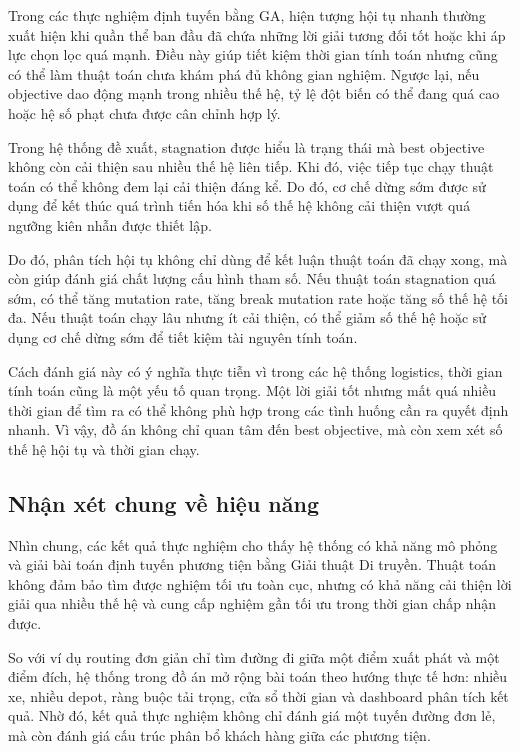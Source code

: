 \documentclass[12pt,a4paper]{article}
\numberwithin{figure}{subsection}
\begin{document}
Trong các thực nghiệm định tuyến bằng GA, hiện tượng hội tụ nhanh thường xuất hiện khi quần thể ban đầu đã chứa những lời giải tương đối tốt hoặc khi áp lực chọn lọc quá mạnh. Điều này giúp tiết kiệm thời gian tính toán nhưng cũng có thể làm thuật toán chưa khám phá đủ không gian nghiệm. Ngược lại, nếu objective dao động mạnh trong nhiều thế hệ, tỷ lệ đột biến có thể đang quá cao hoặc hệ số phạt chưa được cân chỉnh hợp lý.

Trong hệ thống đề xuất, stagnation được hiểu là trạng thái mà best objective không còn cải thiện sau nhiều thế hệ liên tiếp. Khi đó, việc tiếp tục chạy thuật toán có thể không đem lại cải thiện đáng kể. Do đó, cơ chế dừng sớm được sử dụng để kết thúc quá trình tiến hóa khi số thế hệ không cải thiện vượt quá ngưỡng kiên nhẫn được thiết lập.

Do đó, phân tích hội tụ không chỉ dùng để kết luận thuật toán đã chạy xong, mà còn giúp đánh giá chất lượng cấu hình tham số. Nếu thuật toán stagnation quá sớm, có thể tăng mutation rate, tăng break mutation rate hoặc tăng số thế hệ tối đa. Nếu thuật toán chạy lâu nhưng ít cải thiện, có thể giảm số thế hệ hoặc sử dụng cơ chế dừng sớm để tiết kiệm tài nguyên tính toán.

Cách đánh giá này có ý nghĩa thực tiễn vì trong các hệ thống logistics, thời gian tính toán cũng là một yếu tố quan trọng. Một lời giải tốt nhưng mất quá nhiều thời gian để tìm ra có thể không phù hợp trong các tình huống cần ra quyết định nhanh. Vì vậy, đồ án không chỉ quan tâm đến best objective, mà còn xem xét số thế hệ hội tụ và thời gian chạy.

\subsection{Nhận xét chung về hiệu năng}

Nhìn chung, các kết quả thực nghiệm cho thấy hệ thống có khả năng mô phỏng và giải bài toán định tuyến phương tiện bằng Giải thuật Di truyền. Thuật toán không đảm bảo tìm được nghiệm tối ưu toàn cục, nhưng có khả năng cải thiện lời giải qua nhiều thế hệ và cung cấp nghiệm gần tối ưu trong thời gian chấp nhận được.

So với ví dụ routing đơn giản chỉ tìm đường đi giữa một điểm xuất phát và một điểm đích, hệ thống trong đồ án mở rộng bài toán theo hướng thực tế hơn: nhiều xe, nhiều depot, ràng buộc tải trọng, cửa sổ thời gian và dashboard phân tích kết quả. Nhờ đó, kết quả thực nghiệm không chỉ đánh giá một tuyến đường đơn lẻ, mà còn đánh giá cấu trúc phân bổ khách hàng giữa các phương tiện.
\end{document}
